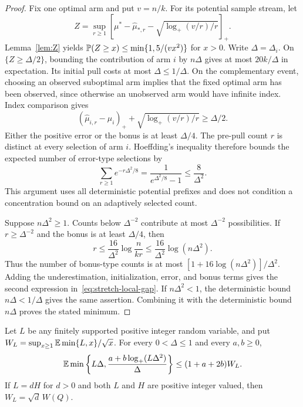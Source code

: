 \begin{proof}
Fix one optimal arm and put $v=n/k$. For its potential sample stream,
let
\[
 Z=\sup_{r\ge1}\left[
       \mu^*-\widehat\mu_{*,r}
       -\sqrt{\log_+(v/r)/r}\right]_+.
\]
Lemma~\ref{lem:Z} yields
$\mathbb P(Z\ge x)\le\min\{1,5/(vx^2)\}$ for $x>0$.
Write $\Delta=\Delta_i$. On $\{Z\ge\Delta/2\}$, bounding the
contribution of arm $i$ by $n\Delta$ gives at most $20k/\Delta$ in
expectation. Its initial pull costs at most $\Delta\le1/\Delta$.
On the complementary event, choosing an observed suboptimal arm
implies that the fixed optimal arm has been observed, since otherwise
an unobserved arm would have infinite index. Index comparison gives
\[
 (\widehat\mu_{i,r}-\mu_i)_+
       +\sqrt{\log_+(v/r)/r}\ge\Delta/2.
\]
Either the positive error or the bonus is at least $\Delta/4$.
The pre-pull count $r$ is distinct at every selection of arm $i$.
Hoeffding's inequality therefore bounds the expected number of
error-type selections by
\[
 \sum_{r\ge1}e^{-r\Delta^2/8}
    =\frac1{e^{\Delta^2/8}-1}\le\frac8{\Delta^2}.
\]
This argument uses all deterministic potential prefixes and does not
condition a concentration bound on an adaptively selected count.

Suppose $n\Delta^2\ge1$. Counts below $\Delta^{-2}$ contribute at most
$\Delta^{-2}$ possibilities. If $r\ge\Delta^{-2}$ and the bonus is
at least $\Delta/4$, then
\[
 r\le\frac{16}{\Delta^2}\log\frac{n}{kr}
    \le\frac{16}{\Delta^2}\log(n\Delta^2).
\]
Thus the number of bonus-type counts is at most
$[1+16\log(n\Delta^2)]/\Delta^2$. Adding the underestimation,
initialization, error, and bonus terms gives the second expression
in~\eqref{eq:stretch-local-gap}. If $n\Delta^2<1$, the deterministic
bound $n\Delta<1/\Delta$ gives the same assertion. Combining it with
the deterministic bound $n\Delta$ proves the stated minimum.
\end{proof}

\begin{lemma}
\label{lem:stretch-average}
Let $L$ be any finitely supported positive integer random variable,
and put
$W_L=\sup_{x\ge1}\mathbb E\min\{L,x\}/\sqrt x$.
For every $0<\Delta\le1$ and every $a,b\ge0$,
\begin{equation}
 \mathbb E\min\left\{L\Delta,
           \frac{a+b\log_+(L\Delta^2)}{\Delta}\right\}
 \le (1+a+2b)W_L.
 \label{eq:stretch-average}
\end{equation}
If $L=dH$ for $d>0$ and both $L$ and $H$ are positive integer valued,
then $W_L=\sqrt d\,W(Q)$.
\end{lemma}

